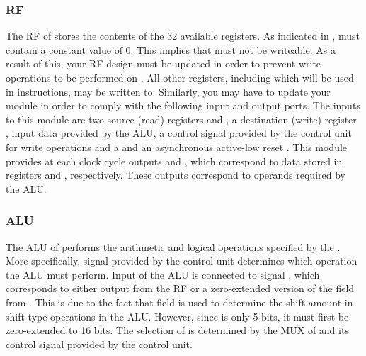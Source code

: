 \documentclass[number=03]{assignment}
\begin{document}
\subsubsection{\acl{RF}}
The \ac{RF} of  stores the contents of the 32 available registers.
As indicated in ,  must contain a constant value of 0. 
This implies that  must not be writeable.
As a result of this, your \ac{RF} design must be updated in order to prevent write operations to be performed on .
All other registers, including  which will be used in \Jtype instructions, may be written to.
Similarly, you may have to update your  module in order to comply with the following input and output ports.
The inputs to this module are two source (read) registers \rs and \rt, a destination (write) register \rd, input data \aluresult provided by the \ac{ALU}, a control signal \rfwe provided by the control unit for write operations and a \clk and an asynchronous active-low reset \asynnrst.
This module provides at each clock cycle outputs \Qs and \Qt, which correspond to data stored in registers \rs and \rt, respectively. 
These outputs correspond to operands required by the \ac{ALU}.

\subsubsection{\acs{ALU}}
The \ac{ALU} of  performs the arithmetic and logical operations specified by the \instruction.
More specifically, signal \aluop provided by the control unit determines which operation the \ac{ALU} must perform.
Input  of the \ac{ALU} is connected to signal \alua, which corresponds to either output \Qs from the \ac{RF} or a zero-extended version of the field \sa from \instruction. 
This is due to the fact that field \sa is used to determine the shift amount in shift-type operations in the \ac{ALU}.
However, since \sa is only 5-bits, it must first be zero-extended to 16 bits.
The selection of \alua is determined by the \ac{MUX} of  and its control signal \aluasel provided by the control unit. 
\end{document}

